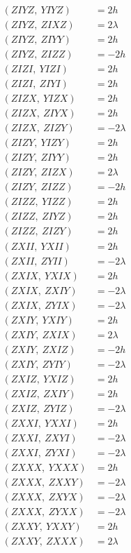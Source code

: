 \documentclass{article}
\begin{document}
\begin{align*}
  (ZIYZ,\ YIYZ) &= 2 h \\
  (ZIYZ,\ ZIXZ) &= 2 \lambda \\
  (ZIYZ,\ ZIYY) &= 2 h \\
  (ZIYZ,\ ZIZZ) &= - 2 h \\
  (ZIZI,\ YIZI) &= 2 h \\
  (ZIZI,\ ZIYI) &= 2 h \\
  (ZIZX,\ YIZX) &= 2 h \\
  (ZIZX,\ ZIYX) &= 2 h \\
  (ZIZX,\ ZIZY) &= - 2 \lambda \\
  (ZIZY,\ YIZY) &= 2 h \\
  (ZIZY,\ ZIYY) &= 2 h \\
  (ZIZY,\ ZIZX) &= 2 \lambda \\
  (ZIZY,\ ZIZZ) &= - 2 h \\
  (ZIZZ,\ YIZZ) &= 2 h \\
  (ZIZZ,\ ZIYZ) &= 2 h \\
  (ZIZZ,\ ZIZY) &= 2 h \\
  (ZXII,\ YXII) &= 2 h \\
  (ZXII,\ ZYII) &= - 2 \lambda \\
  (ZXIX,\ YXIX) &= 2 h \\
  (ZXIX,\ ZXIY) &= - 2 \lambda \\
  (ZXIX,\ ZYIX) &= - 2 \lambda \\
  (ZXIY,\ YXIY) &= 2 h \\
  (ZXIY,\ ZXIX) &= 2 \lambda \\
  (ZXIY,\ ZXIZ) &= - 2 h \\
  (ZXIY,\ ZYIY) &= - 2 \lambda \\
  (ZXIZ,\ YXIZ) &= 2 h \\
  (ZXIZ,\ ZXIY) &= 2 h \\
  (ZXIZ,\ ZYIZ) &= - 2 \lambda \\
  (ZXXI,\ YXXI) &= 2 h \\
  (ZXXI,\ ZXYI) &= - 2 \lambda \\
  (ZXXI,\ ZYXI) &= - 2 \lambda \\
  (ZXXX,\ YXXX) &= 2 h \\
  (ZXXX,\ ZXXY) &= - 2 \lambda \\
  (ZXXX,\ ZXYX) &= - 2 \lambda \\
  (ZXXX,\ ZYXX) &= - 2 \lambda \\
  (ZXXY,\ YXXY) &= 2 h \\
  (ZXXY,\ ZXXX) &= 2 \lambda \\

\end{align*}
\end{document}
